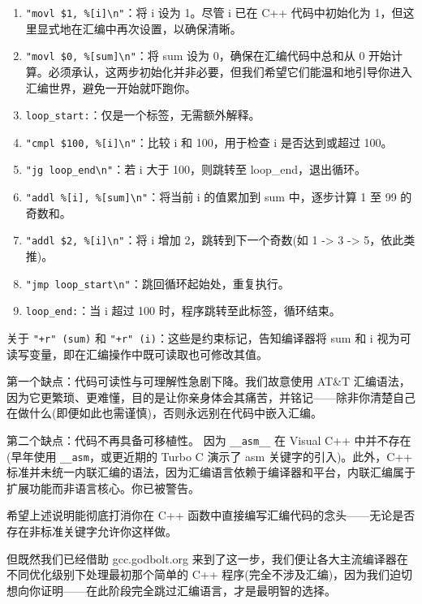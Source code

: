 \begin{enumerate}
\item 
\verb|"movl $1, %[i]\n"|：将 i 设为 1。尽管 i 已在 C++ 代码中初始化为 1，但这里显式地在汇编中再次设置，以确保清晰。

\item 
\verb|"movl $0, %[sum]\n"|：将 sum 设为 0，确保在汇编代码中总和从 0 开始计算。必须承认，这两步初始化并非必要，但我们希望它们能温和地引导你进入汇编世界，避免一开始就吓跑你。

\item 
\verb|loop_start:|：仅是一个标签，无需额外解释。

\item 
\verb|"cmpl $100, %[i]\n"|：比较 i 和 100，用于检查 i 是否达到或超过 100。

\item 
\verb|"jg loop_end\n"|：若 i 大于 100，则跳转至 loop\_end，退出循环。

\item 
\verb|"addl %[i], %[sum]\n"|：将当前 i 的值累加到 sum 中，逐步计算 1 至 99 的奇数和。

\item 
\verb|"addl $2, %[i]\n"|：将 i 增加 2，跳转到下一个奇数(如 1 -> 3 -> 5，依此类推)。

\item 
\verb|"jmp loop_start\n"|：跳回循环起始处，重复执行。

\item 
\verb|loop_end:|：当 i 超过 100 时，程序跳转至此标签，循环结束。
\end{enumerate}

关于 \verb|"+r" (sum)| 和 \verb|"+r" (i)|：这些是约束标记，告知编译器将 sum 和 i 视为可读写变量，即在汇编操作中既可读取也可修改其值。

第一个缺点：代码可读性与可理解性急剧下降。我们故意使用 AT\&T 汇编语法，因为它更繁琐、更难懂，目的是让你亲身体会其痛苦，并铭记——除非你清楚自己在做什么(即便如此也需谨慎)，否则永远别在代码中嵌入汇编。

第二个缺点：代码不再具备可移植性。
因为 \verb|__asm__| 在 Visual C++ 中并不存在(早年使用 \verb|__asm|，或更近期的 Turbo C 演示了 asm 关键字的引入)。此外，C++ 标准并未统一内联汇编的语法，因为汇编语言依赖于编译器和平台，内联汇编属于扩展功能而非语言核心。你已被警告。

希望上述说明能彻底打消你在 C++ 函数中直接编写汇编代码的念头——无论是否存在非标准关键字允许你这样做。

但既然我们已经借助 gcc.godbolt.org 来到了这一步，我们便让各大主流编译器在不同优化级别下处理最初那个简单的 C++ 程序(完全不涉及汇编)，因为我们迫切想向你证明——在此阶段完全跳过汇编语言，才是最明智的选择。

